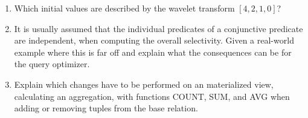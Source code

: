 \begin{enumerate}[label=\arabic*.]
  \item Which initial values are described by the wavelet transform $[4,2,1,0]$?
  \item It is usually assumed that the individual predicates of a conjunctive predicate are independent, when computing the overall selectivity. Given a real-world example where this is far off and explain what the consequences can be for the query optimizer.

  \item Explain which changes have to be performed on an materialized view, calculating an aggregation, with functions COUNT, SUM, and AVG when adding or removing tuples from the base relation.

\end{enumerate}


